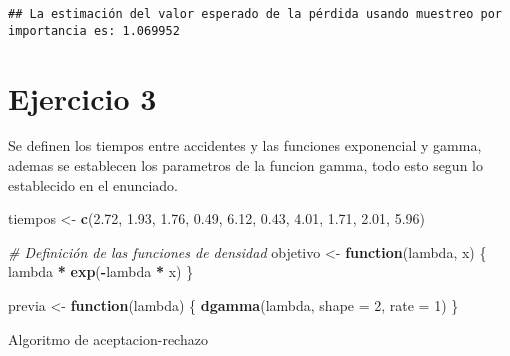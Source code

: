 \documentclass[
]{article}
\newenvironment{Shaded}{\begin{snugshade}}{\end{snugshade}}
\newcommand{\AttributeTok}[1]{\textcolor[rgb]{0.13,0.29,0.53}{#1}}
\newcommand{\CommentTok}[1]{\textcolor[rgb]{0.56,0.35,0.01}{\textit{#1}}}
\newcommand{\ControlFlowTok}[1]{\textcolor[rgb]{0.13,0.29,0.53}{\textbf{#1}}}
\newcommand{\DecValTok}[1]{\textcolor[rgb]{0.00,0.00,0.81}{#1}}
\newcommand{\FloatTok}[1]{\textcolor[rgb]{0.00,0.00,0.81}{#1}}
\newcommand{\FunctionTok}[1]{\textcolor[rgb]{0.13,0.29,0.53}{\textbf{#1}}}
\newcommand{\NormalTok}[1]{#1}
\newcommand{\OtherTok}[1]{\textcolor[rgb]{0.56,0.35,0.01}{#1}}
\newcommand{\SpecialCharTok}[1]{\textcolor[rgb]{0.81,0.36,0.00}{\textbf{#1}}}
\begin{document}
\begin{verbatim}
## La estimación del valor esperado de la pérdida usando muestreo por importancia es: 1.069952
\end{verbatim}

\hypertarget{ejercicio-3}{%
\section{Ejercicio 3}\label{ejercicio-3}}

Se definen los tiempos entre accidentes y las funciones exponencial y
gamma, ademas se establecen los parametros de la funcion gamma, todo
esto segun lo establecido en el enunciado.

\begin{Shaded}
\begin{Highlighting}[]
\NormalTok{tiempos }\OtherTok{\textless{}{-}} \FunctionTok{c}\NormalTok{(}\FloatTok{2.72}\NormalTok{, }\FloatTok{1.93}\NormalTok{, }\FloatTok{1.76}\NormalTok{, }\FloatTok{0.49}\NormalTok{, }\FloatTok{6.12}\NormalTok{, }\FloatTok{0.43}\NormalTok{, }\FloatTok{4.01}\NormalTok{, }\FloatTok{1.71}\NormalTok{, }\FloatTok{2.01}\NormalTok{, }\FloatTok{5.96}\NormalTok{)}

\CommentTok{\# Definición de las funciones de densidad}
\NormalTok{objetivo }\OtherTok{\textless{}{-}} \ControlFlowTok{function}\NormalTok{(lambda, x) \{}
\NormalTok{  lambda }\SpecialCharTok{*} \FunctionTok{exp}\NormalTok{(}\SpecialCharTok{{-}}\NormalTok{lambda }\SpecialCharTok{*}\NormalTok{ x)}
\NormalTok{\}}

\NormalTok{previa }\OtherTok{\textless{}{-}} \ControlFlowTok{function}\NormalTok{(lambda) \{}
  \FunctionTok{dgamma}\NormalTok{(lambda, }\AttributeTok{shape =} \DecValTok{2}\NormalTok{, }\AttributeTok{rate =} \DecValTok{1}\NormalTok{)}
\NormalTok{\}}
\end{Highlighting}
\end{Shaded}

Algoritmo de aceptacion-rechazo
\end{document}
